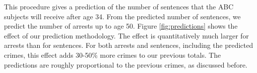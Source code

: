 %

%


\noindent This procedure gives a prediction of the number of sentences that the ABC subjects will receive after age 34. From the predicted number of sentences, we predict the number of arrests up to age 50. Figure \ref{fig:predictions} shows the effect of our prediction methodology. The effect is quantitatively much larger for arrests than for sentences. For both arrests and sentences, including the predicted crimes, this effect adds 30-50\% more crimes to our previous totals. The predictions are roughly proportional to the previous crimes, as discussed before. \\


